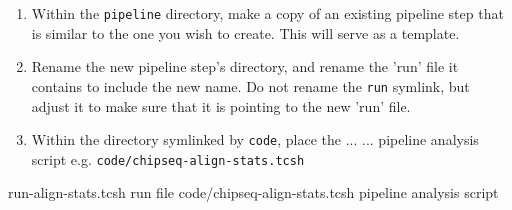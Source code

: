 \begin{enumerate}
\item Within the \texttt{pipeline} directory, make a copy of an existing pipeline step that is similar to the one you wish to create. This will serve as a template. 
\item Rename the new pipeline step's directory, and rename the 'run' file it contains to include the new name. Do not rename the \texttt{run} symlink, but adjust it to make sure that it is pointing to the new 'run' file. 
\item Within the directory symlinked by \texttt{code}, place the ... ... pipeline analysis script e.g. \texttt{code/chipseq-align-stats.tcsh}
\end{enumerate}

run-align-stats.tcsh run file
code/chipseq-align-stats.tcsh pipeline analysis script

% 
